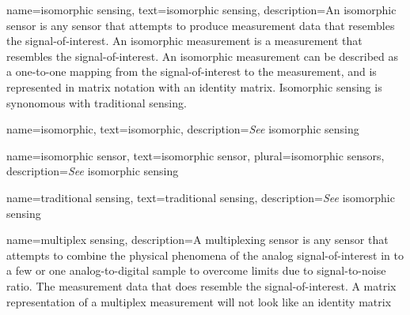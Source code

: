 






{
name={isomorphic sensing},
text={isomorphic sensing},
description={An isomorphic sensor is any sensor that attempts to produce measurement data that resembles the signal-of-interest. An isomorphic measurement is a measurement that resembles the signal-of-interest. An isomorphic measurement can be described as a one-to-one mapping from the signal-of-interest to the measurement, and is represented in matrix notation with an identity matrix. Isomorphic sensing is synonomous with traditional sensing.}
}

{
name={isomorphic},
text={isomorphic},
description={\emph{See} \gls{isomorphic sensing}}
}

{
name={isomorphic sensor},
text={isomorphic sensor},
plural={isomorphic sensors},
description={\emph{See} \gls{isomorphic sensing}}
}

{
name={traditional sensing},
text={traditional sensing},
description={\emph{See} \gls{isomorphic sensing}}
}

{
name={multiplex sensing},
description={A multiplexing sensor is any sensor that attempts to combine the physical phenomena of the analog signal-of-interest in to a few or one analog-to-digital sample to overcome limits due to signal-to-noise ratio. The measurement data that does resemble the signal-of-interest. A matrix representation of a multiplex measurement will not look like an identity matrix}
}

